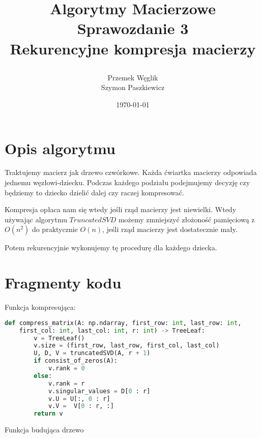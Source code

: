\documentclass{article}
\title {
        Algorytmy Macierzowe \\
        Sprawozdanie 3 \\
        Rekurencyjne kompresja macierzy

}
\author{Przemek Węglik \\ Szymon Paszkiewicz}
\date{\today}
\begin{document}
\maketitle

\tableofcontents

\newpage

\section{Opis algorytmu}
Traktujemy macierz jak drzewo czwórkowe. Każda ćwiartka macierzy odpowiada
jednemu węzłowi-dziecku. Podczas każdego podziału podejmujemy decyzję czy będziemy
to dziecko dzielić dalej czy raczej kompresować.

Kompresja opłaca nam się wtedy jeśli rząd macierzy jest niewielki.
Wtedy używając algorytmu $TruncatedSVD$ możemy zmniejszyć złożoność pamięciową 
z $O(n^{2})$ do praktycznie $O(n)$, jeśli rząd macierzy jest dostatecznie mały.

Potem rekurencyjnie wykonujemy tę procedurę dla każdego dziecka.

\section{Fragmenty kodu}

Funkcja kompresująca:

\begin{lstlisting}[language=Python]
    def compress_matrix(A: np.ndarray, first_row: int, last_row: int, 
    first_col: int, last_col: int, r: int) -> TreeLeaf:
        v = TreeLeaf()
        v.size = (first_row, last_row, first_col, last_col)
        U, D, V = truncatedSVD(A, r + 1)
        if consist_of_zeros(A):
            v.rank = 0
        else:
            v.rank = r
            v.singular_values = D[0 : r]
            v.U = U[:, 0 : r]
            v.V =  V[0 : r, :]
        return v
\end{lstlisting}

Funkcja budująca drzewo
\end{document}
